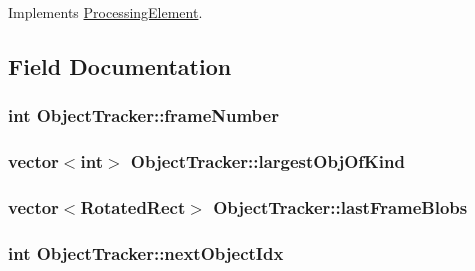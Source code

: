 \-Implements \hyperlink{classProcessingElement_ad231c2198b3c9bbc562328ee84a972ce}{\-Processing\-Element}.



\subsection{\-Field \-Documentation}
\hypertarget{classObjectTracker_af76e8c0b957580b6405794f44ee92c33}{
\subsubsection[{frame\-Number}]{\setlength{\rightskip}{0pt plus 5cm}int {\bf \-Object\-Tracker\-::frame\-Number}}}\label{classObjectTracker_af76e8c0b957580b6405794f44ee92c33}
\hypertarget{classObjectTracker_adc52a70587a375b3bb37110d80bf3564}{
\subsubsection[{largest\-Obj\-Of\-Kind}]{\setlength{\rightskip}{0pt plus 5cm}vector$<$int$>$ {\bf \-Object\-Tracker\-::largest\-Obj\-Of\-Kind}}}\label{classObjectTracker_adc52a70587a375b3bb37110d80bf3564}
\hypertarget{classObjectTracker_afb0135d450dee565305f51af66e9715e}{
\subsubsection[{last\-Frame\-Blobs}]{\setlength{\rightskip}{0pt plus 5cm}vector$<$\-Rotated\-Rect$>$ {\bf \-Object\-Tracker\-::last\-Frame\-Blobs}}}\label{classObjectTracker_afb0135d450dee565305f51af66e9715e}
\hypertarget{classObjectTracker_ad0b03dde977db67886bbb55cba55dc9f}{
\subsubsection[{next\-Object\-Idx}]{\setlength{\rightskip}{0pt plus 5cm}int {\bf \-Object\-Tracker\-::next\-Object\-Idx}}}\label{classObjectTracker_ad0b03dde977db67886bbb55cba55dc9f}
